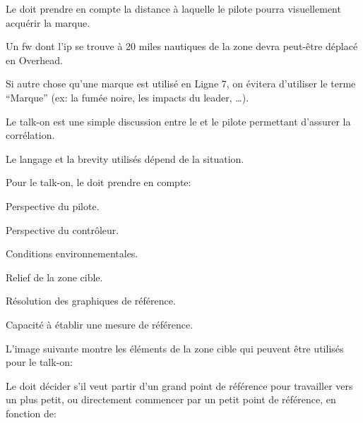 \begin{e1}
\begin{e2}
\begin{e3}
			\item Le \ja{} doit prendre en compte la distance à laquelle le pilote pourra visuellement acquérir la marque.
			
			Un \gls{fw} dont l'\gls{ip} se trouve à 20 miles nautiques de la zone devra peut-être déplacé en Overhead.
			
			\item Si autre chose qu'une marque est utilisé en Ligne 7, on évitera d'utiliser le terme ``Marque'' (ex: la fumée noire, les impacts du leader, \ldots{}).
			
		\end{e3}
		
		
		\begin{e4}
			
			\item Le talk-on est une simple discussion entre le \ja{} et le pilote permettant d'assurer la corrélation.
			
			Le langage et la brevity utilisés dépend de la situation.
			
			Pour le talk-on, le \ja{} doit prendre en compte:
			
			\begin{e5}
				
				\item Perspective du pilote.
				\item Perspective du contrôleur.
				\item Conditions environnementales.
				\item Relief de la zone cible.
				\item Résolution des graphiques de référence.
				\item Capacité à établir une mesure de référence.
				
			\end{e5}
			
			\begin{minipage}{\linewidth}
				
				\item L'image suivante montre les éléments de la zone cible qui peuvent être utilisés pour le talk-on:
				
				
			\end{minipage}
			
			\item Le \ja{} doit décider s'il veut partir d'un grand point de référence pour travailler vers un plus petit, ou directement commencer par un petit point de référence, en fonction de:
			

\end{e4}
\end{e2}
\end{e1}

